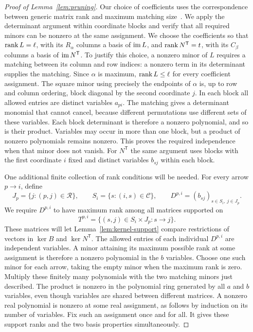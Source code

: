 \begin{proof}[Proof of Lemma~\ref{lem:pruning}]
Our choice of coefficients uses the correspondence between generic matrix
rank and maximum matching size~\cite[Section~5, Theorem~1]{Edmonds1967}.
We apply the determinant argument within coordinate blocks and verify that
all required minors can be nonzero at the same assignment.
We choose the coefficients so that $\operatorname{rank} L=\ell$, with its
$R_\alpha$ columns a basis of $\operatorname{im} L$, and
$\operatorname{rank} N^{\mathsf T}=t$, with its $C_\beta$ columns a basis of
$\operatorname{im} N^{\mathsf T}$.  To justify this choice, a nonzero minor of $L$
requires a matching between its column and row indices: a nonzero term
in its determinant supplies the matching.  Since $\alpha$ is maximum,
$\operatorname{rank} L\leq\ell$ for every coefficient assignment.  The square minor
using precisely the endpoints of $\alpha$ is, up to row and column
ordering, block diagonal by the second coordinate $j$.  In each block
all allowed entries are distinct variables $a_{pi}$.  The matching
gives a determinant monomial that cannot cancel, because different
permutations use different sets of these variables.  Each block
determinant is therefore a nonzero polynomial, and so is their product.
Variables may occur in more than one block, but a product of nonzero
polynomials remains nonzero.  This proves the required independence
when that minor does not vanish.  For $N^{\mathsf T}$ the same argument
uses blocks with the first coordinate $i$ fixed and distinct variables
$b_{sj}$ within each block.

One additional finite collection of rank conditions will be needed.
For every arrow $p\to i$, define
\[
 J_p=\{j:(p,j)\in\mathcal R\},\qquad
 S_i=\{s:(i,s)\in\mathcal C\},\qquad
 D^{p,i}=(b_{sj})_{s\in S_i,\ j\in J_p}.
\]
We require $D^{p,i}$ to have maximum rank among all matrices supported
on
\[
 T^{p,i}=\{(s,j)\in S_i\times J_p:s\to j\}.
\]
These matrices will let Lemma~\ref{lem:kernel-support} compare restrictions
of vectors in $\ker B$ and $\ker N^{\mathsf T}$.
The allowed entries of each individual $D^{p,i}$ are independent
variables.  A minor attaining its maximum possible rank at some
assignment is therefore a nonzero polynomial in the $b$ variables.
Choose one such minor for each arrow, taking the empty minor when the
maximum rank is zero.  Multiply these finitely many polynomials with
the two matching minors just described.  The product is nonzero in the
polynomial ring generated by all $a$ and $b$ variables, even though
variables are shared between different matrices.  A nonzero real
polynomial is nonzero at some real assignment, as follows by induction
on its number of variables.  Fix such an assignment once and for all.
It gives these support ranks and the two basis properties simultaneously.


\end{proof}
